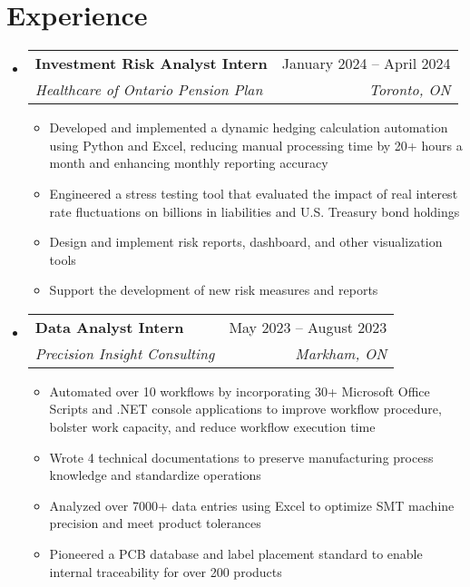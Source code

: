 \documentclass[letterpaper,11pt]{article}
\makeatletter
\newcommand{\resumeItem}[1]{
  \item\small{
    {#1 \vspace{-2pt}}
  }
}
\newcommand{\resumeSubheading}[4]{
  \vspace{-2pt}\item
    \begin{tabular*}{0.97\textwidth}[t]{l@{\extracolsep{\fill}}r}
      \textbf{#1} & #2 \\
      \textit{\small#3} & \textit{\small #4} \\
    \end{tabular*}\vspace{-7pt}
}
\newcommand{\resumeSubHeadingListStart}{\begin{itemize}[leftmargin=0.15in, label={}]}
\newcommand{\resumeSubHeadingListEnd}{\end{itemize}}
\newcommand{\resumeItemListStart}{\begin{itemize}}
\newcommand{\resumeItemListEnd}{\end{itemize}\vspace{-5pt}}
\makeatother
\begin{document}
\section{Experience}
  \resumeSubHeadingListStart
    \resumeSubheading
    {Investment Risk Analyst Intern}{January 2024 -- April 2024}
    {Healthcare of Ontario Pension Plan}{Toronto, ON}
\resumeItemListStart
    \resumeItem{Developed and implemented a dynamic hedging calculation automation using Python 
    and Excel, reducing manual processing time by 20+ hours a month and enhancing monthly reporting accuracy}
    \resumeItem{Engineered a stress testing tool that evaluated the impact of real interest rate fluctuations 
    on billions in liabilities and U.S. Treasury bond holdings}
    \resumeItem{Design and implement risk reports, dashboard, and other visualization tools}
    \resumeItem{Support the development of new risk measures and reports}
\resumeItemListEnd
    \resumeSubheading
    {Data Analyst Intern}{May 2023 -- August 2023}
    {Precision Insight Consulting}{Markham, ON}
\resumeItemListStart
    \resumeItem{Automated over 10 workflows by incorporating 30+ Microsoft Office Scripts and .NET console applications to
    improve workflow procedure, bolster work capacity, and reduce workflow execution time}
    \resumeItem{Wrote 4 technical documentations to preserve manufacturing process knowledge and standardize operations}
    \resumeItem{Analyzed over 7000+ data entries using Excel to optimize SMT machine precision and meet product tolerances}
    \resumeItem{Pioneered a PCB database and label placement standard to enable internal traceability for over 200 products}
\resumeItemListEnd


\resumeSubHeadingListEnd

\end{document}
